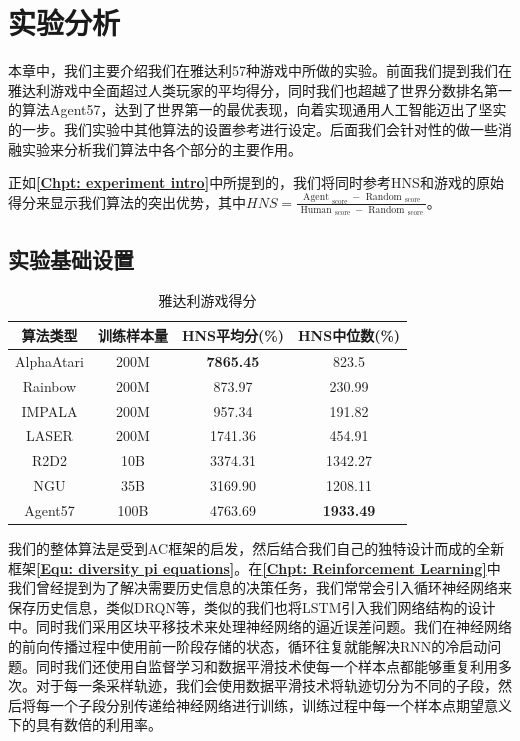 \chapter{实验分析}
\label{Chpt: experiment analyze}

本章中，我们主要介绍我们在雅达利57种游戏中所做的实验。前面我们提到我们在雅达利游戏中全面超过人类玩家的平均得分，同时我们也超越了世界分数排名第一的算法Agent57，达到了世界第一的最优表现，向着实现通用人工智能迈出了坚实的一步。我们实验中其他算法的设置参考进行设定。后面我们会针对性的做一些消融实验来分析我们算法中各个部分的主要作用。

正如\textbf{\ref{Chpt: experiment intro}}中所提到的，我们将同时参考HNS和游戏的原始得分来显示我们算法的突出优势，其中$HNS=\frac{\text { Agent }_{\text {score }}-\text { Random }_{\text {score }}}{\text { Human }_{\text {score }}-\text { Random }_{\text {score }}}$。

\section{实验基础设置}

\begin{table}[H]
    \centering
    \caption{雅达利游戏得分}
    \begin{tabular}{c|c|c|c}
    \toprule
     算法类型 & 训练样本量 &HNS平均分(\%) &HNS中位数(\%)  \\
    \midrule
    AlphaAtari  & 200M  &\textbf{7865.45}   & 823.5 \\
    Rainbow     & 200M  &873.97             & 230.99 \\
    IMPALA      & 200M  &957.34             & 191.82 \\
    LASER       & 200M  &1741.36            & 454.91 \\
    R2D2        & 10B   &3374.31            & 1342.27 \\
    NGU         & 35B   &3169.90            & 1208.11 \\
    Agent57     & 100B  & 4763.69           & \textbf{1933.49} \\
    \bottomrule
    \end{tabular}
    \label{tab:atari_results}
\end{table}


我们的整体算法是受到AC框架的启发，然后结合我们自己的独特设计而成的全新框架\textbf{\eqref{Equ: diversity pi equations}}。在\textbf{\ref{Chpt: Reinforcement Learning}}中我们曾经提到为了解决需要历史信息的决策任务，我们常常会引入循环神经网络来保存历史信息，类似DRQN等，类似的我们也将LSTM引入我们网络结构的设计中。同时我们采用区块平移技术来处理神经网络的逼近误差问题。我们在神经网络的前向传播过程中使用前一阶段存储的状态，循环往复就能解决RNN的冷启动问题。同时我们还使用自监督学习和数据平滑技术使每一个样本点都能够重复利用多次。对于每一条采样轨迹，我们会使用数据平滑技术将轨迹切分为不同的子段，然后将每一个子段分别传递给神经网络进行训练，训练过程中每一个样本点期望意义下的具有数倍的利用率。

